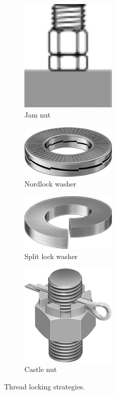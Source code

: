 \begin{figure}[H]
		\begin{subfigure}[b]{.24\linewidth}
			\includegraphics[width=0.5\textwidth]{imgs/jamnut.png}
			\caption{Jam nut}
		\end{subfigure}\begin{subfigure}[b]{.24\linewidth}
			\includegraphics[width=0.5\textwidth]{imgs/nordlock.png}
			\caption{Nordlock washer}
		\end{subfigure}\begin{subfigure}[b]{.24\linewidth}
			\includegraphics[width=0.5\textwidth]{imgs/splitlock.png}
			\caption{Split lock washer}
		\end{subfigure}\begin{subfigure}[b]{.24\linewidth}
			\includegraphics[width=0.5\textwidth]{imgs/castlenut.png}
			\caption{Castle nut}
		\end{subfigure}
		\caption{Thread locking strategies.}
	\end{figure}
	
